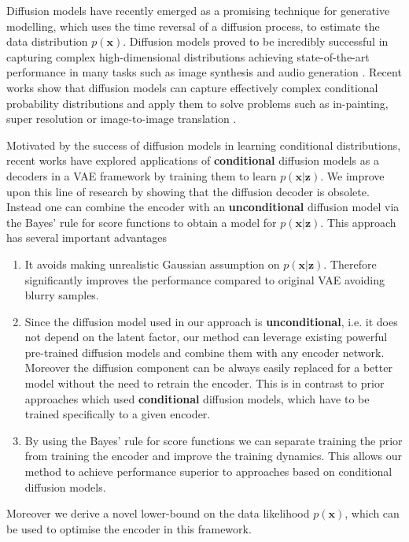 Diffusion models \cite{diffusion_models, ddpm} have recently emerged as a promising technique for generative modelling, which uses the time reversal of a diffusion process, to estimate the data distribution $p(\textbf{x})$. Diffusion models proved to be incredibly successful in capturing complex high-dimensional distributions achieving state-of-the-art performance in many tasks such as image synthesis \cite{dhariwal2021diffusion_beats_gans} and audio generation \cite{kong2020diffwave}. Recent works show that diffusion models can capture effectively complex conditional probability distributions and apply them to solve problems such as in-painting, super resolution or image-to-image translation \cite{batzolis2022non_uniform, saharia2021sr3}.

Motivated by the success of diffusion models in learning conditional distributions, recent works \cite{preechakul2022diffusion_decoder, yang2023ldiffusion_decoder_compression} have explored applications of \textbf{conditional} diffusion models as a decoders in a VAE framework by training them to learn $p(\textbf{x} | \textbf{z})$. We improve upon this line of research by  showing that the diffusion decoder is obsolete. Instead one can combine the encoder with an \textbf{unconditional} diffusion model via the Bayes' rule for score functions to obtain a model for $p(\textbf{x}| \textbf{z})$.
This approach has several important advantages

\begin{enumerate}
    \item It avoids making unrealistic Gaussian assumption on $p(\textbf{x} | \textbf{z})$. Therefore significantly improves the performance compared to original VAE avoiding blurry samples.
    \item Since the diffusion model used in our approach is \textbf{unconditional}, i.e. it does not depend on the latent factor, our method can leverage existing powerful pre-trained  diffusion models and combine them with any encoder network. Moreover the diffusion component can be always easily replaced for a better model without the need to retrain the encoder. This is in contrast to prior approaches which used \textbf{conditional} diffusion models, which have to be trained specifically to a given encoder.
    \item By using the Bayes' rule for score functions we can separate training the prior from training the encoder and improve the training dynamics. This allows our method to achieve performance superior to approaches based on conditional diffusion models.
\end{enumerate}
Moreover we derive a novel lower-bound on the data likelihood $p(\textbf{x})$, which can be used to optimise the encoder in this framework.

